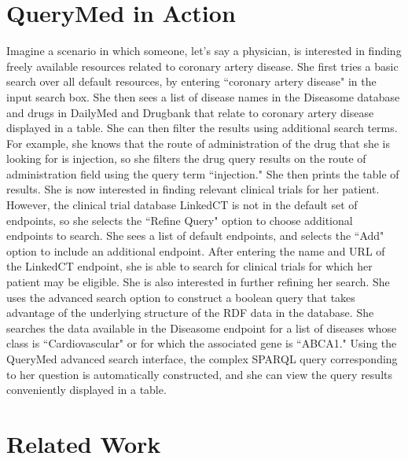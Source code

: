 \documentclass{acm_proc_article-sp}
\begin{document}

\section{QueryMed in Action}

Imagine a scenario in which someone, let's say a physician, is interested in finding freely available resources related to coronary artery disease.  She first tries a basic search over all default resources, by entering ``coronary artery disease" in the input search box.   She then sees a list of disease names in the Diseasome database and drugs in DailyMed and Drugbank that relate to coronary artery disease displayed in a table.  She can then filter the results using additional search terms.  For example, she knows that the route of administration of the drug that she is looking for is injection, so she filters the drug query results on the route of administration field using the query term ``injection."  She then prints the table of results. She is now interested in finding relevant clinical trials for her patient.  However, the clinical trial database LinkedCT is not in the default set of endpoints, so she selects the ``Refine Query" option to choose additional endpoints to search.  She sees a list of default endpoints, and selects the ``Add" option to include an additional endpoint.  After entering the name and URL of the LinkedCT endpoint, she is able to search for clinical trials for which her patient may be eligible.  She is also interested in further refining her search.  She uses the advanced search option to construct a boolean query that takes advantage of the underlying structure of the RDF data in the database.  She searches the data available in the Diseasome endpoint for a list of diseases whose class is ``Cardiovascular" or for which the associated gene is ``ABCA1."  Using the QueryMed advanced search interface, the complex SPARQL query corresponding to her question is automatically constructed, and she can view the query results conveniently displayed in a table.

\section{Related Work}
\label{related}
\end{document}
